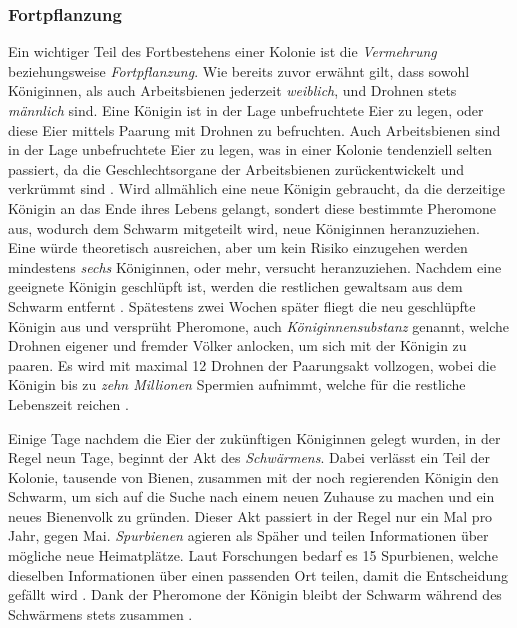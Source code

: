 \subsubsection{Fortpflanzung}
Ein wichtiger Teil des Fortbestehens einer Kolonie ist die \textit{Vermehrung} beziehungsweise \textit{Fortpflanzung}. Wie bereits zuvor erwähnt gilt, dass sowohl Königinnen, als auch Arbeitsbienen jederzeit \textit{weiblich}, und Drohnen stets \textit{männlich} sind. Eine Königin ist in der Lage unbefruchtete Eier zu legen, oder diese Eier mittels Paarung mit Drohnen zu befruchten. Auch Arbeitsbienen sind in der Lage unbefruchtete Eier zu legen, was in einer Kolonie tendenziell selten passiert, da die Geschlechtsorgane der Arbeitsbienen zurückentwickelt und verkrümmt sind \cite*[]{bees:sex}. Wird allmählich eine neue Königin gebraucht, da die derzeitige Königin an das Ende ihres Lebens gelangt, sondert diese bestimmte Pheromone aus, wodurch dem Schwarm mitgeteilt wird, neue Königinnen heranzuziehen. Eine würde theoretisch ausreichen, aber um kein Risiko einzugehen werden mindestens \textit{sechs} Königinnen, oder mehr, versucht heranzuziehen. Nachdem eine geeignete Königin geschlüpft ist, werden die restlichen gewaltsam aus dem Schwarm entfernt \cite*[S.33]{bees:frisch}. Spätestens zwei Wochen später fliegt die neu geschlüpfte Königin aus und versprüht Pheromone, auch \textit{Königinnensubstanz} genannt, welche Drohnen eigener und fremder Völker anlocken, um sich mit der Königin zu paaren. Es wird mit maximal 12 Drohnen der Paarungsakt vollzogen, wobei die Königin bis zu \textit{zehn Millionen} Spermien aufnimmt, welche für die restliche Lebenszeit reichen \cite*[]{bees:queen}.

Einige Tage nachdem die Eier der zukünftigen Königinnen gelegt wurden, in der Regel neun Tage, beginnt der Akt des \textit{Schwärmens}. Dabei verlässt ein Teil der Kolonie, tausende von Bienen, zusammen mit der noch regierenden Königin den Schwarm, um sich auf die Suche nach einem neuen Zuhause zu machen und ein neues Bienenvolk zu gründen. Dieser Akt passiert in der Regel nur ein Mal pro Jahr, gegen Mai. \textit{Spurbienen} agieren als Späher und teilen Informationen über mögliche neue Heimatplätze. Laut Forschungen bedarf es 15 Spurbienen, welche dieselben Informationen über einen passenden Ort teilen, damit die Entscheidung gefällt wird \cite*[]{bees:swarm}. Dank der Pheromone der Königin bleibt der Schwarm während des Schwärmens stets zusammen \cite*[]{bees:queen}. 

